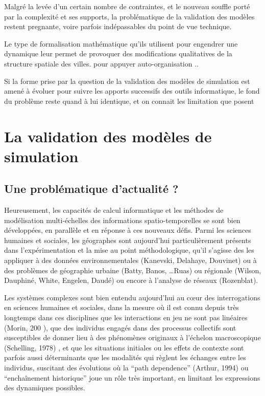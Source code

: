 
Malgré la levée d'un certain nombre de contraintes, et le nouveau souffle porté par la complexité et ses supports, la problématique de la validation des modèles restent pregnante, voire parfois indépassables du point de vue technique.  \autocite[296]{Batty1976} 

Le type de formalisation mathématique qu'ils utilisent pour engendrer une dynamique leur permet de provoquer des modifications qualitatives de la structure spatiale des villes. \autocite{Pumain1984} pour appuyer auto-organisation ..

Si la forme prise par la question de la validation des modèles de simulation est amené à évoluer pour suivre les apports successifs des outils informatique, le fond du problème reste quand à lui identique, et on connait les limitation que posent 

\section{La validation des modèles de simulation}
\label{sec:constante_problematique}

\subsection{Une problématique d'actualité ?} 

Heureusement, les capacités de calcul informatique et les méthodes de modélisation multi-échelles des informations spatio-temporelles se sont bien développées, en parallèle et en réponse à ces nouveaux défis. Parmi les sciences humaines et sociales, les géographes sont aujourd'hui particulièrement présents dans l’expérimentation et la mise au point méthodologique, qu’il s’agisse des les appliquer à des données environnementales (Kanevski, Delahaye, Douvinet) ou à des problèmes de géographie urbaine (Batty, Banos, …Ruas) ou régionale (Wilson, Dauphiné, White, Engelen, Daudé) ou encore à l’analyse de réseaux (Rozenblat). 

Les systèmes complexes sont bien entendu aujourd'hui au cœur des interrogations en sciences humaines et sociales, dans la mesure où il est connu depuis très longtemps dans ces disciplines que les interactions en jeu ne sont pas linéaires   (Morin, 200 ), que des individus engagés dans des processus collectifs sont susceptibles de donner lieu à des phénomènes originaux à l’échelon macroscopique (Schelling, 1978) , et que les situations initiales ou les effets de contexte sont parfois aussi déterminants que les modalités qui règlent les échanges entre les individus, suscitant des évolutions où la \foreignquote{english}{path dependence}  (Arthur, 1994) ou \enquote{enchaînement historique} joue un rôle très important, en limitant les expressions des dynamiques possibles.

